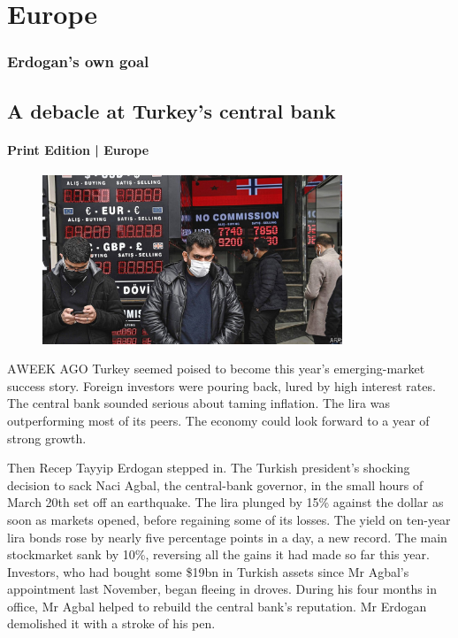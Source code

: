 \documentclass{article}
\begin{document}
\section{Europe }
\subsubsection{Erdogan's own goal }
\subsection{A debacle at Turkey's central bank }
\paragraph{Print Edition | Europe  \quad \color{gray}{Mar 25th 2021 }}
\begin{figure}[h]
\centering
\includegraphics[width=0.8\textwidth]{images/20210327_eup002.jpg}
\end{figure}
\lettrine{A} WEEK AGO Turkey seemed poised to become this year's emerging-market success story. Foreign investors were pouring back, lured by high interest rates. The central bank sounded serious about taming inflation. The lira was outperforming most of its peers. The economy could look forward to a year of strong growth. 

Then Recep Tayyip Erdogan stepped in. The Turkish president's shocking decision to sack Naci Agbal, the central-bank governor, in the small hours of March 20th set off an earthquake. The lira plunged by 15\% against the dollar as soon as markets opened, before regaining some of its losses. The yield on ten-year lira bonds rose by nearly five percentage points in a day, a new record. The main stockmarket sank by 10\%, reversing all the gains it had made so far this year. Investors, who had bought some \$19bn in Turkish assets since Mr Agbal's appointment last November, began fleeing in droves. During his four months in office, Mr Agbal helped to rebuild the central bank's reputation. Mr Erdogan demolished it with a stroke of his pen. 
\end{document}
